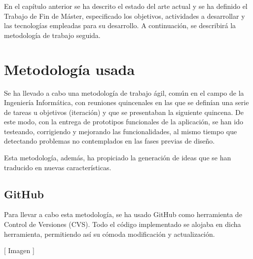 

En el capítulo anterior se ha descrito el estado del arte actual y se ha definido el Trabajo de Fin de Máster, especificado los objetivos, actividades a desarrollar y las tecnologías empleadas para su desarrollo. A continuación, se describirá la metodología de trabajo seguida.


\section{Metodología usada}
\label{2:sec:1}

Se ha llevado a cabo una metodología de trabajo ágil, común en el campo de la Ingeniería Informática, con reuniones quincenales en las que se definían una serie de tareas u objetivos (iteración) y que se presentaban la siguiente quincena. 
De este modo, con la entrega de prototipos funcionales de la aplicación, se han ido testeando, corrigiendo y mejorando las 
funcionalidades, al mismo tiempo que detectando problemas no contemplados en las fases previas de diseño.

Esta metodología, además, ha propiciado la generación de ideas que se han traducido en nuevas características.


\subsection{GitHub}
\label{subsec:2.1.1}

Para llevar a cabo esta metodología, se ha usado GitHub como herramienta de Control de Versiones (CVS).
Todo el código implementado se alojaba en dicha herramienta, permitiendo así su cómoda modificación y actualización.

[ Imagen ]


